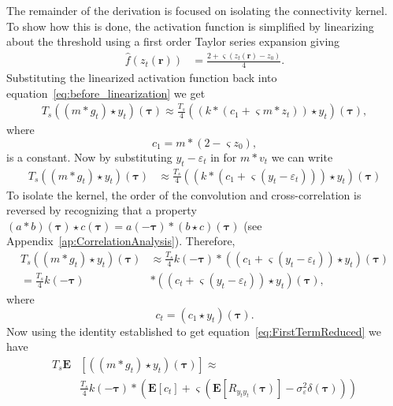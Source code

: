 \documentclass[10pt,twocolumn,twoside]{IEEEtran}
\begin{document}
The remainder of the derivation is focused on isolating the connectivity kernel. To show how this is done, the activation function is simplified by linearizing about the threshold using a first order Taylor series expansion giving
\begin{align}
	\hat{f}(z_t\left(\mathbf{r}\right)) &=\frac{2 + \varsigma(z_t\left(\mathbf{r}\right) - z_0)}{4}. 
\end{align}	
Substituting the linearized activation function back into equation~\ref{eq:before_linearization} we get
\begin{align}	
	T_s((m \ast g_t) \star y_t)(\boldsymbol\tau) \approx \frac{T_s}{4}((k\ast (c_1 + \varsigma m \ast z_t)) \star y_t)(\boldsymbol\tau), 
\end{align}
where
\begin{equation}
	c_1 = m\ast (2 - \varsigma z_0),
\end{equation}
is a constant. Now by substituting $y_t - \varepsilon_t$ in for $m\ast v_t$ we can write
\begin{align}
	T_s((m \ast g_t) \star y_t)(\boldsymbol\tau) &\approx \frac{T_s}{4}((k\ast (c_1 + \varsigma (y_t - \varepsilon_t))) \star y_t) (\boldsymbol\tau)
\end{align}
To isolate the kernel, the order of the convolution and cross-correlation is reversed by recognizing that a property $(a \ast b)(\boldsymbol\tau) \star c(\boldsymbol\tau) = a(-\boldsymbol\tau)\ast(b \star c)(\boldsymbol\tau)$ (see Appendix~\ref{ap:CorrelationAnalysis}). Therefore,
\begin{align}
	T_s((m \ast g_t) \star y_t)(\boldsymbol\tau) &\approx \frac{T_s}{4} k(-\boldsymbol\tau) \ast ((c_1 + \varsigma (y_t - \varepsilon_t)) \star y_t)(\boldsymbol\tau) \nonumber\\
	= \frac{T_s}{4}k(-\boldsymbol\tau) & \ast (( c_t + \varsigma (y_t - \varepsilon_t)) \star y_t) (\boldsymbol\tau),
\end{align}
where
\begin{equation}
	c_t = (c_1\star y_t)(\boldsymbol\tau).
\end{equation}  
Now using the identity established to get equation~\ref{eq:FirstTermReduced} we have
\begin{align}\label{eq:second_term_reduced}
	T_s\mathbf{E}&\left[((m \ast g_t) \star y_t)(\boldsymbol\tau)\right] \approx \nonumber \\
	&\frac{T_s}{4} k(-\boldsymbol\tau) \ast (\mathbf{E}\left[c_t\right] + \varsigma (\mathbf{E}\left[R_{y_ty_t}(\boldsymbol\tau)\right] - \sigma_{\varepsilon}^2 \delta(\boldsymbol\tau)))
\end{align}
\end{document}
